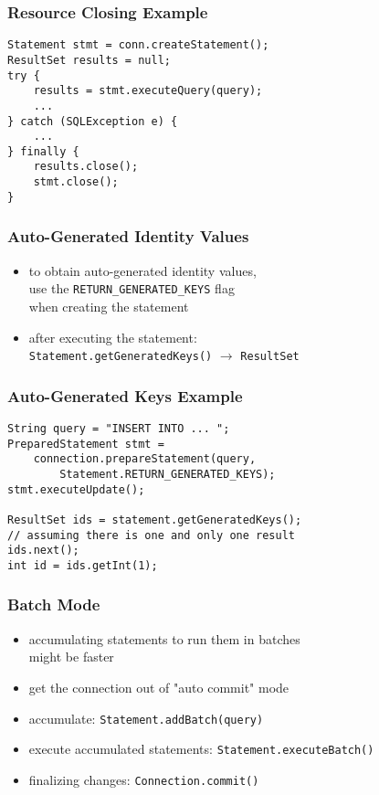 \documentclass[dvipsnames]{beamer}
\theoremstyle{plain}
\begin{document}
\begin{frame}[fragile]
  \frametitle{Resource Closing Example}

  \begin{block}{}
    \begin{lstlisting}
Statement stmt = conn.createStatement();
ResultSet results = null;
try {
    results = stmt.executeQuery(query);
    ...
} catch (SQLException e) {
    ...
} finally {
    results.close();
    stmt.close();
}
    \end{lstlisting}
  \end{block}
\end{frame}

\begin{frame}
  \frametitle{Auto-Generated Identity Values}

  \begin{itemize}
    \item to obtain auto-generated identity values,\\
      use the \lstinline!RETURN_GENERATED_KEYS! flag\\
      when creating the statement
    \item after executing the statement:\\
      \lstinline!Statement.getGeneratedKeys()! $\rightarrow$
      \lstinline!ResultSet!
  \end{itemize}
\end{frame}

\begin{frame}[fragile]
  \frametitle{Auto-Generated Keys Example}

  \begin{block}{}
    \begin{lstlisting}
String query = "INSERT INTO ... ";
PreparedStatement stmt =
    connection.prepareStatement(query,
        Statement.RETURN_GENERATED_KEYS);
stmt.executeUpdate();

ResultSet ids = statement.getGeneratedKeys();
// assuming there is one and only one result
ids.next();
int id = ids.getInt(1);
    \end{lstlisting}
  \end{block}
\end{frame}

\begin{frame}
  \frametitle{Batch Mode}

  \begin{itemize}
    \item accumulating statements to run them in batches\\
      might be faster

    \pause
    \medskip
    \item get the connection out of "auto commit" mode
    \item accumulate: \lstinline!Statement.addBatch(query)!
    \item execute accumulated statements: \lstinline!Statement.executeBatch()!
    \item finalizing changes: \lstinline!Connection.commit()!
  \end{itemize}
\end{frame}
\end{document}

